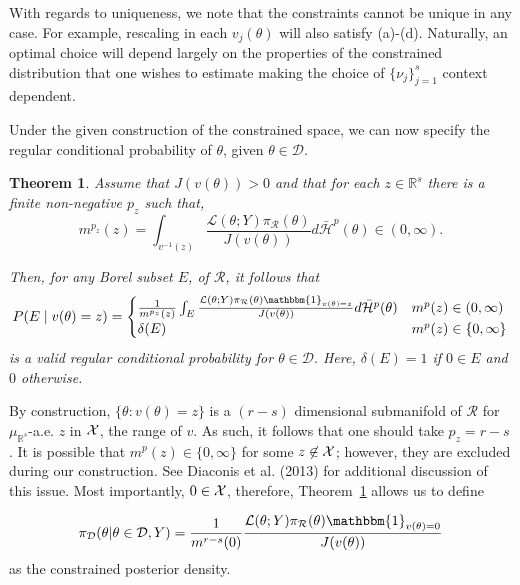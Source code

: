 \documentclass[10pt,fleqn]{article} \pdfoutput=1
\newtheorem{theorem}{Theorem} \newtheorem{lemma}{Lemma}
\DeclareMathOperator{\1}{\mathbbm{1}} \DeclareMathOperator{\bigO}{\mc O}
\begin{document}
With regards to uniqueness, we note that the constraints cannot be unique
in any case.  For example, rescaling in each $v_j(\theta)$ will also satisfy (a)-(d). Naturally, an optimal choice will depend largely on the properties of the
constrained distribution that one wishes to estimate making the choice of
$\{\nu_j\}_{j=1}^s$ context dependent.

Under the given construction of the constrained space, we can now specify
the regular conditional probability of $\theta$, given $\theta \in
	\mathcal{D}.$ 

	\begin{theorem}\citep{diaconis2013manifold}
	\label{THM:RCP_construction} Assume that $J(v(\theta)) > 0$ and
	that for each $z\in\mathbb{R}^s$ there is a finite non-negative
	 $p_z$ such that,  $$m^{p_z}(z) = \int_{v^{-1}(z)}
		\frac{\mathcal{L}(\theta; Y) \pi_\mathcal{R}(\theta)}
			{J(v(\theta))} d\bar{\mathcal{H}}^{p}(\theta)
		\in (0,\infty).$$ 

		Then, for any Borel subset $E$, of
	$\mathcal{R}$, it follows that $$P(E \mid v(\theta) = z) = \begin{cases}
			\frac{1}{m^{p_z}(z)} \int_E \frac{\mathcal{L}(\theta; Y)
				\pi_\mathcal{R}(\theta)
				\mathbbm{1}_{v(\theta)=z}}{J(v(\theta))} d\bar{\mathcal{H}}^{p}(\theta)
			 & m^p(z)\in (0,\infty) \\ \delta (E) & m^p(z) \in \{0,\infty\}
		\end{cases}$$ 
		is a valid regular conditional probability for
	$\theta\in\mathcal{D}.$ Here, $\delta (E)=1$ if $0\in E$ and $0$ otherwise.
\end{theorem}

By construction, $\{\theta:v(\theta)=z\}$ is a $(r-s)$ dimensional
submanifold of $\mathcal{R}$ for $\mu_{\mathbb{R}^s}$-a.e. $z$ in $\mathcal{X}$, the range
of $v$. As such, it follows that one should take $p_z=r-s$. It is possible that
$m^p(z)\in\{0,\infty\}$ for some $z\not\in \mathcal{X}$; however, they are excluded during our construction. See Diaconis et al. (2013)
for additional discussion of this issue. Most importantly, $0\in \mathcal{X}$, therefore, Theorem~\ref{THM:RCP_construction} allows us to define

\begin{equation} \label{EQ:Constrained_rcp}
	\pi_\mathcal{D}(\theta|\theta\in\mathcal{D},Y) = \frac{1}{m^{r-s}({0})}
	\frac{\mathcal{L}(\theta; Y) \pi_\mathcal{R}(\theta)
	\mathbbm{1}_{v(\theta)={0}}}{J(v(\theta))} \end{equation} as the
constrained posterior density.
\end{document}

